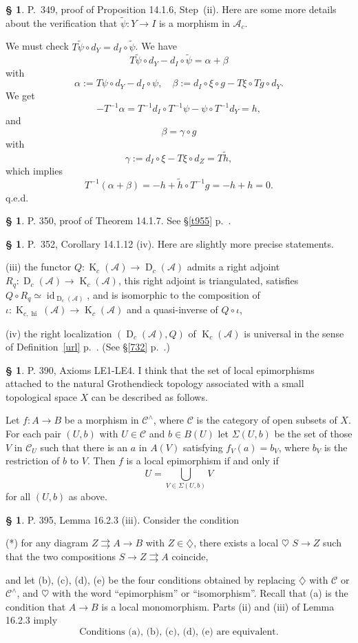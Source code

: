 \documentclass[12pt]{article}
\theoremstyle{remark}
\theoremstyle{definition}
\newtheorem{s}[thm]{\S}
\newcommand{\A}{\mathcal A}
\newcommand{\C}{\mathcal C}
\newcommand{\oo}{\operatorname}
\newcommand{\parar}{\rightrightarrows}\newcommand{\paralelarrows}{\rightrightarrows}%
\DeclareMathOperator{\id}{id}
\begin{document}
%
%
\begin{s} 
P.~349, proof of Proposition 14.1.6, Step~(ii). Here are some more details about the verification that $\widetilde\psi:Y\to I$ is a morphism in $\A_c$. 

We must check $T\widetilde\psi\circ d_Y=d_I\circ\widetilde\psi$. We have 
$$
T\widetilde\psi\circ d_Y-d_I\circ\widetilde\psi=\alpha+\beta
$$
with
$$
\alpha:=T\psi\circ d_Y-d_I\circ\psi,\quad\beta :=d_I\circ\xi\circ g-T\xi\circ Tg\circ d_Y.
$$ 
We get 
$$
-T^{-1}\alpha=T^{-1}d_I\circ T^{-1}\psi-\psi\circ T^{-1}d_Y=h,
$$ 
and 
$$
\beta=\gamma\circ g
$$ 
with 
$$
\gamma:=d_I\circ\xi-T\xi\circ d_Z=T\widetilde h,
$$ 
which implies 
$$
T^{-1}(\alpha+\beta)=-h+\widetilde h\circ T^{-1}g=-h+h=0.
$$
q.e.d.
\end{s}
%
%
\begin{s} 
P. 350, proof of Theorem 14.1.7. See \S\ref{t955} p.~\pageref{t955}.
\end{s}
%
%
\begin{s} 
P.~352, Corollary 14.1.12 (iv). Here are slightly more precise statements. 

\noindent(iii) the functor $Q:\oo K_c(\A)\to\oo D_c(\A)$ admits a right adjoint $R_q:\oo D_c(\A)\to\oo K_c(\A)$, this right adjoint is triangulated, satisfies $Q\circ R_q\simeq\id_{\oo D_c(\A)}$, and is isomorphic to the composition of $\iota:\oo K_{c,\oo{hi}}(\A)\to\oo K_c(\A)$ and a quasi-inverse of $Q\circ\iota$,

\noindent(iv) the right localization $(\oo D_c(\A),Q)$ of $\oo K_c(\A)$ is universal in the sense of Definition~\ref{url} p.~\pageref{url}. (See \S\ref{732} p.~\pageref{732}.)
\end{s}
%
%
\begin{s} 
P. 390, Axioms LE1-LE4. I think that the set of local epimorphisms attached to the natural Grothendieck topology associated with a small topological space $X$ can be described as follows. 

Let $f:A\to B$ be a morphism in $\C^\wedge$, where $\C$ is the category of open subsets of $X$. For each pair $(U,b)$ with $U\in\C$ and $b\in B(U)$ let $\Sigma(U,b)$ be the set of those $V$ in $\C_U$ such that there is an $a$ in $A(V)$ satisfying $f_V(a)=b_V$, where $b_V$ is the restriction of $b$ to $V$. Then $f$ is a local epimorphism if and only if 
$$
U=\bigcup_{V\in\Sigma(U,b)}V
$$ 
for all $(U,b)$ as above.
\end{s}
%
%
\begin{s} 
P. 395, Lemma 16.2.3 (iii). Consider the condition 

\noindent(*) for any diagram $Z\parar A\to B$ with $Z\in\diamondsuit$, there exists a local $\heartsuit$ $S\to Z$ such that the two compositions $S\to Z\parar A$ coincide, 

\noindent and let (b), (c), (d), (e) be the four conditions obtained by replacing $\diamondsuit$ with $\C$ or $\C^\wedge$, and $\heartsuit$ with the word ``epimorphism'' or ``isomorphism''. Recall that (a) is the condition that $A\to B$ is a local monomorphism. Parts (ii) and (iii) of Lemma 16.2.3 imply 
%
\begin{equation}\label{1623}
\text{Conditions (a), (b), (c), (d), (e) are equivalent.}
\end{equation}
\end{s}
\end{document}
